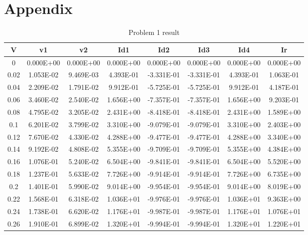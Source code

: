 \documentclass{article}
\begin{document}
\section{Appendix}
\begin{center}
    \begin{longtable}{|c|c|c|c|c|c|c|c|}
    \caption{Problem 1 result} \label{tab:problem 1} \\
        \hline
        V & v1 & v2 & Id1 & Id2 & Id3 & Id4 & Ir \\ \hline
        0 & 0.000E+00 & 0.000E+00 & 0.000E+00 & 0.000E+00 & 0.000E+00 & 0.000E+00 & 0.000E+00 \\ \hline
        0.02 & 1.053E-02 & 9.469E-03 & 4.393E-01 & -3.331E-01 & -3.331E-01 & 4.393E-01 & 1.063E-01 \\ \hline
        0.04 & 2.209E-02 & 1.791E-02 & 9.912E-01 & -5.725E-01 & -5.725E-01 & 9.912E-01 & 4.187E-01 \\ \hline
        0.06 & 3.460E-02 & 2.540E-02 & 1.656E+00 & -7.357E-01 & -7.357E-01 & 1.656E+00 & 9.203E-01 \\ \hline
        0.08 & 4.795E-02 & 3.205E-02 & 2.431E+00 & -8.418E-01 & -8.418E-01 & 2.431E+00 & 1.589E+00 \\ \hline
        0.1 & 6.201E-02 & 3.799E-02 & 3.310E+00 & -9.079E-01 & -9.079E-01 & 3.310E+00 & 2.403E+00 \\ \hline
        0.12 & 7.670E-02 & 4.330E-02 & 4.288E+00 & -9.477E-01 & -9.477E-01 & 4.288E+00 & 3.340E+00 \\ \hline
        0.14 & 9.192E-02 & 4.808E-02 & 5.355E+00 & -9.709E-01 & -9.709E-01 & 5.355E+00 & 4.384E+00 \\ \hline
        0.16 & 1.076E-01 & 5.240E-02 & 6.504E+00 & -9.841E-01 & -9.841E-01 & 6.504E+00 & 5.520E+00 \\ \hline
        0.18 & 1.237E-01 & 5.633E-02 & 7.726E+00 & -9.914E-01 & -9.914E-01 & 7.726E+00 & 6.735E+00 \\ \hline
        0.2 & 1.401E-01 & 5.990E-02 & 9.014E+00 & -9.954E-01 & -9.954E-01 & 9.014E+00 & 8.019E+00 \\ \hline
        0.22 & 1.568E-01 & 6.318E-02 & 1.036E+01 & -9.976E-01 & -9.976E-01 & 1.036E+01 & 9.363E+00 \\ \hline
        0.24 & 1.738E-01 & 6.620E-02 & 1.176E+01 & -9.987E-01 & -9.987E-01 & 1.176E+01 & 1.076E+01 \\ \hline
        0.26 & 1.910E-01 & 6.899E-02 & 1.320E+01 & -9.994E-01 & -9.994E-01 & 1.320E+01 & 1.220E+01 \\ \hline

\end{longtable}
\end{center}
\end{document}
